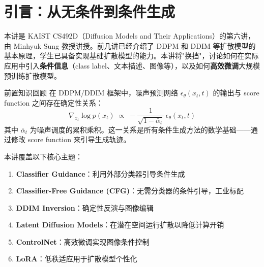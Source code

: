 \section{引言：从无条件到条件生成}

本讲是 KAIST CS492D（Diffusion Models and Their Applications）的第六讲，由 Minhyuk Sung 教授讲授。前几讲已经介绍了 DDPM 和 DDIM 等扩散模型的基本原理，学生已具备实现基础扩散模型的能力。本讲将"换挡"，讨论如何在实际应用中引入\textbf{条件信息}（class label、文本描述、图像等），以及如何\textbf{高效微调}大规模预训练扩散模型。

\begin{knowledgebox}{前置知识回顾}
在 DDPM/DDIM 框架中，噪声预测网络 $\epsilon_\theta(x_t, t)$ 的输出与 score function 之间存在确定性关系：
$$
\nabla_{x_t} \log p(x_t) \;\propto\; -\frac{1}{\sqrt{1-\bar\alpha_t}}\,\epsilon_\theta(x_t, t)
$$
其中 $\bar\alpha_t$ 为噪声调度的累积乘积。这一关系是所有条件生成方法的数学基础——通过修改 score function 来引导生成轨迹。
\end{knowledgebox}

本讲覆盖以下核心主题：
\begin{enumerate}
    \item \textbf{Classifier Guidance}：利用外部分类器引导条件生成
    \item \textbf{Classifier-Free Guidance (CFG)}：无需分类器的条件引导，工业标配
    \item \textbf{DDIM Inversion}：确定性反演与图像编辑
    \item \textbf{Latent Diffusion Models}：在潜在空间运行扩散以降低计算开销
    \item \textbf{ControlNet}：高效微调实现图像条件控制
    \item \textbf{LoRA}：低秩适应用于扩散模型个性化
\end{enumerate}

\newpage
